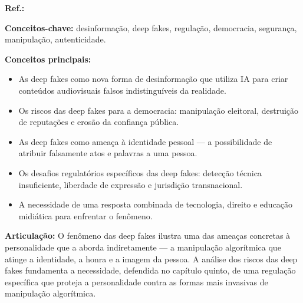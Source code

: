 \begin{fichamento}
    \textbf{Ref.:} \cite{Chesney2019DF}
    
    \textbf{Conceitos-chave:} desinformação, deep fakes, regulação, democracia, segurança, manipulação, autenticidade.
    
    \textbf{Conceitos principais:}
    \begin{itemize}
        \item As deep fakes como nova forma de desinformação que utiliza IA para criar conteúdos audiovisuais falsos indistinguíveis da realidade.
        \item Os riscos das deep fakes para a democracia: manipulação eleitoral, destruição de reputações e erosão da confiança pública.
        \item As deep fakes como ameaça à identidade pessoal — a possibilidade de atribuir falsamente atos e palavras a uma pessoa.
        \item Os desafios regulatórios específicos das deep fakes: detecção técnica insuficiente, liberdade de expressão e jurisdição transnacional.
        \item A necessidade de uma resposta combinada de tecnologia, direito e educação midiática para enfrentar o fenômeno.
    \end{itemize}
    
    \textbf{Articulação:} O fenômeno das deep fakes ilustra uma das ameaças concretas à personalidade que a \MH{} aborda indiretamente — a manipulação algorítmica que atinge a identidade, a honra e a imagem da pessoa. A análise dos riscos das deep fakes fundamenta a necessidade, defendida no capítulo quinto, de uma regulação específica que proteja a personalidade contra as formas mais invasivas de manipulação algorítmica.
\end{fichamento}

